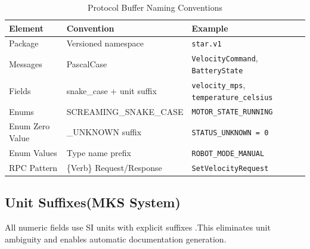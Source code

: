 \begin{table}[H]
\centering
\caption{Protocol Buffer Naming Conventions}
\label{tab:proto-naming-style}
\begin{tabular}{|l|l|l|}
\hline
\textbf{Element} & \textbf{Convention} & \textbf{Example} \\
\hline
Package & Versioned namespace & \texttt{star.v1} \\
Messages & PascalCase & \texttt{VelocityCommand}, \texttt{BatteryState} \\
Fields & snake\_case + unit suffix & \texttt{velocity\_mps}, \texttt{temperature\_celsius} \\
Enums & SCREAMING\_SNAKE\_CASE & \texttt{MOTOR\_STATE\_RUNNING} \\
Enum Zero Value & \_UNKNOWN suffix & \texttt{STATUS\_UNKNOWN = 0} \\
Enum Values & Type name prefix & \texttt{ROBOT\_MODE\_MANUAL} \\
RPC Pattern & \{Verb\} Request/Response & \texttt{SetVelocityRequest} \\
\hline
\end{tabular}
\end{table}

\subsection{Unit Suffixes(MKS System)}

All numeric fields use SI units with explicit suffixes
    .This eliminates unit ambiguity and enables automatic documentation
        generation.

